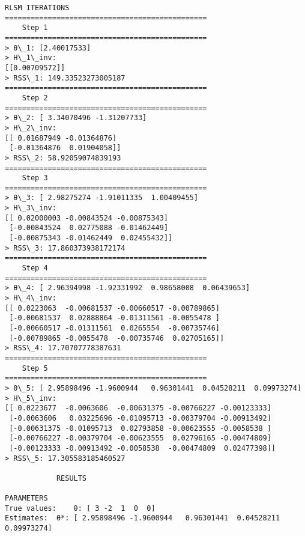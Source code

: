 \documentclass[11pt]{article}
\begin{document}
\begin{Verbatim}[commandchars=\\\{\}]
		RLSM ITERATIONS
===============================================
	Step 1
===============================================
> θ\_1: [2.40017533]
> H\_1\_inv:
[[0.00709572]]
> RSS\_1: 149.33523273005187
===============================================
	Step 2
===============================================
> θ\_2: [ 3.34070496 -1.31207733]
> H\_2\_inv:
[[ 0.01687949 -0.01364876]
 [-0.01364876  0.01904058]]
> RSS\_2: 58.92059074839193
===============================================
	Step 3
===============================================
> θ\_3: [ 2.98275274 -1.91011335  1.00409455]
> H\_3\_inv:
[[ 0.02000003 -0.00843524 -0.00875343]
 [-0.00843524  0.02775088 -0.01462449]
 [-0.00875343 -0.01462449  0.02455432]]
> RSS\_3: 17.860373938172174
===============================================
	Step 4
===============================================
> θ\_4: [ 2.96394998 -1.92331992  0.98658008  0.06439653]
> H\_4\_inv:
[[ 0.0223063  -0.00681537 -0.00660517 -0.00789865]
 [-0.00681537  0.02888864 -0.01311561 -0.0055478 ]
 [-0.00660517 -0.01311561  0.0265554  -0.00735746]
 [-0.00789865 -0.0055478  -0.00735746  0.02705165]]
> RSS\_4: 17.70707778387631
===============================================
	Step 5
===============================================
> θ\_5: [ 2.95898496 -1.9600944   0.96301441  0.04528211  0.09973274]
> H\_5\_inv:
[[ 0.0223677  -0.0063606  -0.00631375 -0.00766227 -0.00123333]
 [-0.0063606   0.03225696 -0.01095713 -0.00379704 -0.00913492]
 [-0.00631375 -0.01095713  0.02793858 -0.00623555 -0.0058538 ]
 [-0.00766227 -0.00379704 -0.00623555  0.02796165 -0.00474809]
 [-0.00123333 -0.00913492 -0.0058538  -0.00474809  0.02477398]]
> RSS\_5: 17.305583185460527

			RESULTS

PARAMETERS
True values:	θ: [ 3 -2  1  0  0]
Estimates:	θ*: [ 2.95898496 -1.9600944   0.96301441  0.04528211  0.09973274]

    \end{Verbatim}

    \begin{center}
    \end{center}
    { \hspace*{\fill} \\}
    
\end{document}
